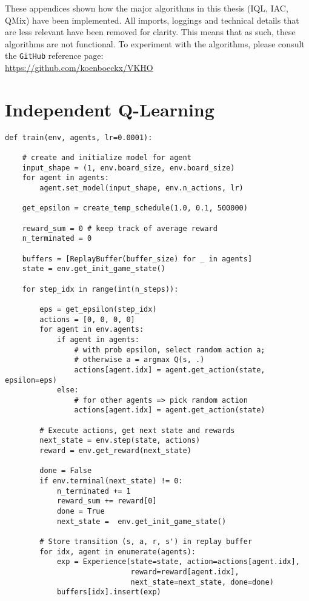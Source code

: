 \begin{appendices}
These appendices shown how the major algorithms in this thesis (IQL, IAC, QMix) have been implemented. All imports, loggings and technical details that are less relevant have been removed for clarity. This means that as such, these algorithms are not functional. To experiment with the algorithms, please consult the {\tt GitHub} reference page:\\ \url{https://github.com/koenboeckx/VKHO}

\chapter{Independent Q-Learning}
\label{app:iql}

\begin{verbatim}
def train(env, agents, lr=0.0001):
    
    # create and initialize model for agent
    input_shape = (1, env.board_size, env.board_size)
    for agent in agents:
        agent.set_model(input_shape, env.n_actions, lr)

    get_epsilon = create_temp_schedule(1.0, 0.1, 500000)

    reward_sum = 0 # keep track of average reward
    n_terminated = 0

    buffers = [ReplayBuffer(buffer_size) for _ in agents]
    state = env.get_init_game_state()
    
    for step_idx in range(int(n_steps)):
        
        eps = get_epsilon(step_idx)
        actions = [0, 0, 0, 0]
        for agent in env.agents:
            if agent in agents:
                # with prob epsilon, select random action a;
                # otherwise a = argmax Q(s, .)
                actions[agent.idx] = agent.get_action(state, epsilon=eps)
            else:
                # for other agents => pick random action
                actions[agent.idx] = agent.get_action(state)
        
        # Execute actions, get next state and rewards
        next_state = env.step(state, actions)
        reward = env.get_reward(next_state)

        done = False
        if env.terminal(next_state) != 0:
            n_terminated += 1
            reward_sum += reward[0]
            done = True
            next_state =  env.get_init_game_state()

        # Store transition (s, a, r, s') in replay buffer
        for idx, agent in enumerate(agents):
            exp = Experience(state=state, action=actions[agent.idx],
                             reward=reward[agent.idx],
                             next_state=next_state, done=done)
            buffers[idx].insert(exp)


\end{verbatim}
\end{appendices}
